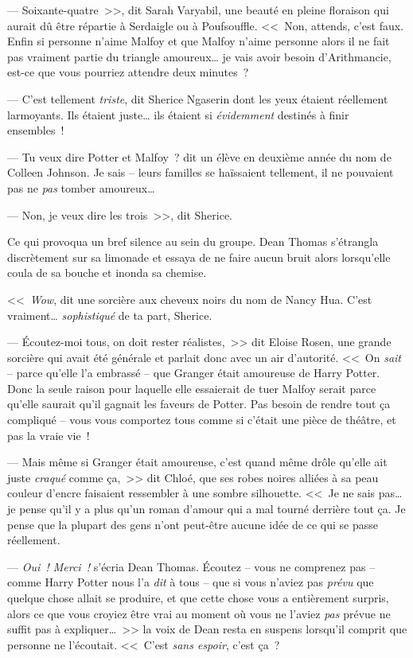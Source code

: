 --- Soixante-quatre~>>, dit Sarah Varyabil, une beauté en pleine floraison qui aurait dû être répartie à Serdaigle ou à Poufsouffle. <<~Non, attends, c'est faux. Enfin si personne n'aime Malfoy et que Malfoy n'aime personne alors il ne fait pas vraiment partie du triangle amoureux… je vais avoir besoin d'Arithmancie, est-ce que vous pourriez attendre deux minutes~?

--- C'est tellement \emph{triste}, dit Sherice Ngaserin dont les yeux étaient réellement larmoyants. Ils étaient juste… ils étaient si \emph{évidemment} destinés à finir ensembles~!

--- Tu veux dire Potter et Malfoy~? dit un élève en deuxième année du nom de Colleen Johnson. Je sais -- leurs familles se haïssaient tellement, il ne pouvaient pas ne \emph{pas} tomber amoureux…

--- Non, je veux dire les trois~>>, dit Sherice.

Ce qui provoqua un bref silence au sein du groupe. Dean Thomas s'étrangla discrètement sur sa limonade et essaya de ne faire aucun bruit alors lorsqu'elle coula de sa bouche et inonda sa chemise.

<<~\emph{Wow}, dit une sorcière aux cheveux noirs du nom de Nancy Hua. C'est vraiment… \emph{sophistiqué} de ta part, Sherice.

--- Écoutez-moi tous, on doit rester réalistes,~>> dit Eloise Rosen, une grande sorcière qui avait été générale et parlait donc avec un air d'autorité. <<~On \emph{sait} -- parce qu'elle l'a embrassé -- que Granger était amoureuse de Harry Potter. Donc la seule raison pour laquelle elle essaierait de tuer Malfoy serait parce qu'elle saurait qu'il gagnait les faveurs de Potter. Pas besoin de rendre tout ça compliqué -- vous vous comportez tous comme si c'était une pièce de théâtre, et pas la vraie vie~!

--- Mais même si Granger était amoureuse, c'est quand même drôle qu'elle ait juste \emph{craqué} comme ça,~>> dit Chloé, que ses robes noires alliées à sa peau couleur d'encre faisaient ressembler à une sombre silhouette. <<~Je ne sais pas… je pense qu'il y a plus qu'un roman d'amour qui a mal tourné derrière tout ça. Je pense que la plupart des gens n'ont peut-être aucune idée de ce qui se passe réellement.

--- \emph{Oui~! Merci~!} s'écria Dean Thomas. Écoutez -- vous ne comprenez pas -- comme Harry Potter nous l'a \emph{dit} à tous -- que si vous n'aviez pas \emph{prévu} que quelque chose allait se produire, et que cette chose vous a entièrement surpris, alors ce que vous croyiez être vrai au moment où vous ne l'aviez \emph{pas} prévue ne suffit pas à expliquer…~>> la voix de Dean resta en suspens lorsqu'il comprit que personne ne l'écoutait. <<~C'est \emph{sans espoir}, c'est ça~?

